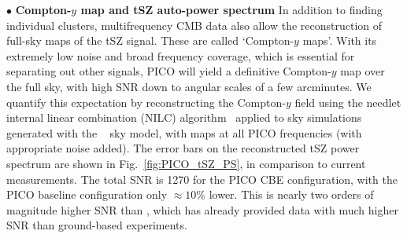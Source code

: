 \documentclass[PICOReport.tex]{subfiles}
\begin{document}
%
\noindent$\bullet$ {\bf Compton-$y$ map and tSZ auto-power spectrum} \hspace{0.1in} \label{ymap}  In addition to finding individual clusters, multifrequency CMB data also allow the reconstruction of full-sky maps of the tSZ signal. These are called  \lq Compton-$y$ maps\rq. %
With its extremely low noise and broad frequency coverage, which is essential for separating out other signals, PICO will yield a definitive Compton-$y$ map over the full sky, with high \ac{SNR} down to angular scales of a few arcminutes.  We quantify this expectation by reconstructing the Compton-$y$ field using the needlet internal linear combination (NILC) algorithm~\citep{Delabrouille2009} applied to sky simulations generated with the \planck~ sky model, with maps at all PICO frequencies (with appropriate noise added).  The error bars on the reconstructed tSZ power spectrum are shown in Fig.~\ref{fig:PICO_tSZ_PS}, in comparison to current measurements.  The total \ac{SNR} is 1270 for the PICO CBE configuration, with the PICO baseline configuration only $\approx 10$\% lower.  This is nearly two orders of magnitude higher \ac{SNR} than \planck , which has already provided data with much higher \ac{SNR} than ground-based experiments. 
\end{document}
